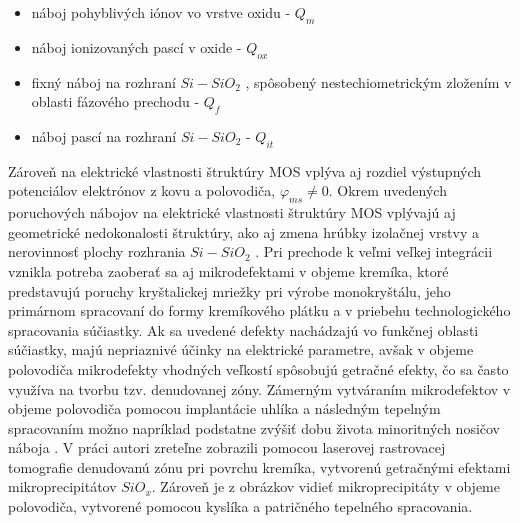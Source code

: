 \begin{itemize}
\item náboj pohyblivých iónov vo vrstve oxidu - $Q_{m}$
\item náboj ionizovaných pascí v oxide - $Q_{ox}$
\item fixný náboj na rozhraní $Si-SiO_2$ , spôsobený nestechiometrickým
  zložením v oblasti fázového prechodu - $Q_f$
\item náboj pascí na rozhraní $Si-SiO_2$  - $Q_{it}$
\end{itemize}

\par Zároveň na elektrické vlastnosti štruktúry MOS vplýva aj rozdiel
výstupných potenciálov elektrónov z kovu a polovodiča,
$\varphi_{ms}\neq{0}$.  Okrem uvedených poruchových nábojov na
elektrické vlastnosti štruktúry MOS vplývajú aj geometrické
nedokonalosti štruktúry, ako aj zmena hrúbky izolačnej vrstvy a
nerovinnosť plochy rozhrania $Si-SiO_2$ . Pri prechode k veľmi veľkej
integrácii vznikla potreba zaoberať sa aj mikrodefektami v objeme
kremíka, ktoré predstavujú poruchy kryštalickej mriežky pri výrobe
monokryštálu, jeho primárnom spracovaní do formy kremíkového plátku a
v priebehu technologického spracovania súčiastky. Ak sa uvedené
defekty nachádzajú vo funkčnej oblasti súčiastky, majú nepriaznivé
účinky na elektrické parametre, avšak v objeme polovodiča mikrodefekty
vhodných veľkostí spôsobujú getračné efekty, čo sa často využíva na
tvorbu tzv. denudovanej zóny.  Zámerným vytváraním mikrodefektov v
objeme polovodiča pomocou implantácie uhlíka a následným tepelným
spracovaním možno napríklad podstatne zvýšiť dobu života minoritných
nosičov náboja \cite{1.13}. V práci \cite{1.14} autori zreteľne
zobrazili pomocou laserovej rastrovacej tomografie denudovanú zónu pri
povrchu kremíka, vytvorenú getračnými efektami mikroprecipitátov
$SiO_x$. Zároveň je z obrázkov vidieť mikroprecipitáty v objeme
polovodiča, vytvorené pomocou kyslíka a patričného tepelného
spracovania.

